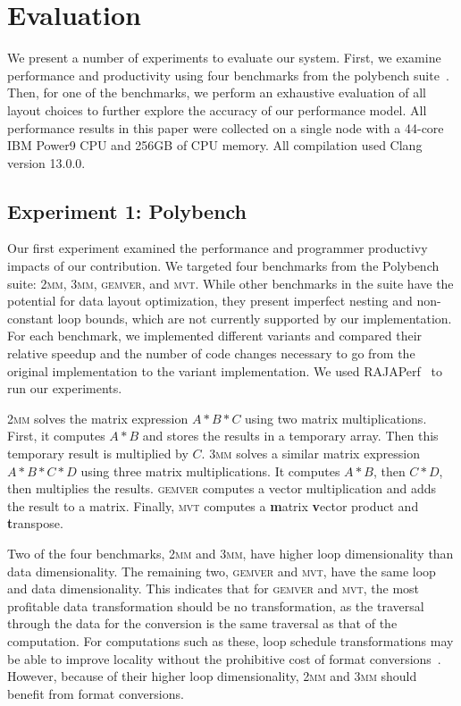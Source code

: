\documentclass[sigconf]{acmart}
\begin{document}
\section{Evaluation}

We present a number of experiments to evaluate our system. 
First, we examine performance and productivity using four benchmarks from the polybench suite~\cite{pouchet2012polybench}.
Then, for one of the benchmarks, we perform an exhaustive evaluation of all layout choices to further explore the accuracy of our performance model.
All performance results in this paper were collected on a single node with a 44-core IBM Power9 CPU and 256GB of CPU memory.
All compilation used Clang version 13.0.0.

\subsection{Experiment 1: Polybench}

Our first experiment examined the performance and programmer productivy impacts of our contribution.
We targeted four benchmarks from the Polybench suite: \textsc{2mm}, \textsc{3mm}, \textsc{gemver}, and \textsc{mvt}.
While other benchmarks in the suite have the potential for data layout optimization, they present imperfect nesting and non-constant loop bounds, which are not currently supported by our implementation. 
For each benchmark, we implemented different variants and compared their relative speedup and the number of code changes necessary to go from the original implementation to the variant implementation.
We used RAJAPerf~\cite{hornung2017raja} to run our experiments.

\textsc{2mm} solves the matrix expression $A*B*C$ using two matrix multiplications. 
First, it computes $A*B$ and stores the results in a temporary array.
Then this temporary result is multiplied by $C$.
\textsc{3mm} solves a similar matrix expression $A*B*C*D$ using three matrix multiplications.
It computes $A*B$, then $C*D$, then multiplies the results.
\textsc{gemver} computes a vector multiplication and adds the result to a matrix. 
Finally, \textsc{mvt} computes a \textbf{m}atrix \textbf{v}ector product and \textbf{t}ranspose.

Two of the four benchmarks, \textsc{2mm} and \textsc{3mm}, have higher loop dimensionality than data dimensionality. 
The remaining two, \textsc{gemver} and \textsc{mvt}, have the same loop and data dimensionality. 
This indicates that for \textsc{gemver} and \textsc{mvt}, the most profitable data transformation should be no transformation, as the traversal through the data for the conversion is the same traversal as that of the computation.
For computations such as these, loop schedule transformations may be able to improve locality without the prohibitive cost of format conversions~\cite{kandemir1998improving}.
However, because of their higher loop dimensionality, \textsc{2mm} and \textsc{3mm} should benefit from format conversions.
\end{document}
